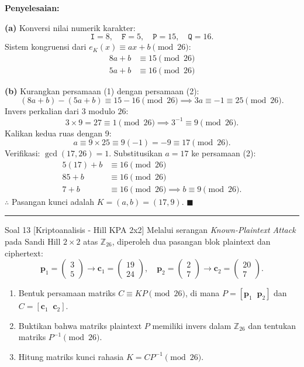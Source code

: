 \documentclass[11pt,a4paper]{article}
\newenvironment{solusi}{\noindent\textbf{\textsf{Penyelesaian:}}\par\vspace{0.2em}}{\hfill$\blacksquare$\vspace{1em}\par\hrule\vspace{1em}}
\begin{document}
\begin{solusi}
\textbf{(a)} Konversi nilai numerik karakter:
\[
\texttt{I} = 8, \quad \texttt{F} = 5, \quad \texttt{P} = 15, \quad \texttt{Q} = 16.
\]
Sistem kongruensi dari $e_K(x) \equiv ax + b \pmod{26}$:
\begin{align}
8a + b &\equiv 15 \pmod{26} \\
5a + b &\equiv 16 \pmod{26}
\end{align}

\textbf{(b)} Kurangkan persamaan (1) dengan persamaan (2):
\[
(8a + b) - (5a + b) \equiv 15 - 16 \pmod{26} \implies 3a \equiv -1 \equiv 25 \pmod{26}.
\]
Invers perkalian dari $3$ modulo $26$:
\[
3 \times 9 = 27 \equiv 1 \pmod{26} \implies 3^{-1} \equiv 9 \pmod{26}.
\]
Kalikan kedua ruas dengan 9:
\[
a \equiv 9 \times 25 \equiv 9(-1) = -9 \equiv 17 \pmod{26}.
\]
Verifikasi: $\gcd(17, 26) = 1$.
Substitusikan $a = 17$ ke persamaan (2):
\begin{align*}
5(17) + b &\equiv 16 \pmod{26} \\
85 + b &\equiv 16 \pmod{26} \\
7 + b &\equiv 16 \pmod{26} \implies b \equiv 9 \pmod{26}.
\end{align*}
$\therefore$ Pasangan kunci adalah $K = (a, b) = (17, 9)$.
\end{solusi}

\begin{soalanalisis}{Soal 13 [Kriptoanalisis - Hill KPA 2x2]}
Melalui serangan \textit{Known-Plaintext Attack} pada Sandi Hill $2 \times 2$ atas $\mathbb{Z}_{26}$, diperoleh dua pasangan blok plaintext dan ciphertext:
\[
\mathbf{p}_1 = \begin{pmatrix} 3 \\ 5 \end{pmatrix} \to \mathbf{c}_1 = \begin{pmatrix} 19 \\ 24 \end{pmatrix}, \quad \mathbf{p}_2 = \begin{pmatrix} 2 \\ 7 \end{pmatrix} \to \mathbf{c}_2 = \begin{pmatrix} 20 \\ 7 \end{pmatrix}.
\]
\begin{enumerate}[label=(\alph*)]
    \item Bentuk persamaan matriks $C \equiv K P \pmod{26}$, di mana $P = [\mathbf{p}_1 \;\; \mathbf{p}_2]$ dan $C = [\mathbf{c}_1 \;\; \mathbf{c}_2]$.
    \item Buktikan bahwa matriks plaintext $P$ memiliki invers dalam $\mathbb{Z}_{26}$ dan tentukan matriks $P^{-1} \pmod{26}$.
    \item Hitung matriks kunci rahasia $K = C P^{-1} \pmod{26}$.
\end{enumerate}
\end{soalanalisis}
\end{document}
